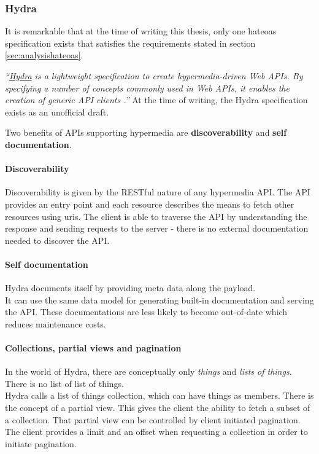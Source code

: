 \subsubsection{Hydra}
It is remarkable that at the time of writing this thesis, only one \gls{hateoas} specification exists that satisfies the requirements stated in section \ref{sec:analysishateoas}.

\textit{``\href{http://www.hydra-cg.com/}{Hydra} is a lightweight specification to create hypermedia-driven Web APIs. By specifying a number of concepts commonly used in Web APIs, it enables the creation of generic API clients \citep{hydraspecs}.''} At the time of writing, the Hydra specification exists as an unofficial draft.

Two benefits of APIs supporting hypermedia are \textbf{discoverability} and \textbf{self documentation}.

\paragraph{Discoverability} Discoverability is given by the RESTful nature of any hypermedia API. The API provides an entry point and each resource describes the means to fetch other resources using \gls{uri}s. The client is able to traverse the API by understanding the response and sending requests to the server - there is no external documentation needed to discover the API.

\paragraph{Self documentation}
Hydra documents itself by providing meta data along the payload. \\
It can use the same data model for generating built-in documentation and serving the API. These documentations are less likely to become out-of-date which reduces maintenance costs.

\paragraph{Collections, partial views and pagination}
In the world of Hydra, there are conceptually only \textit{things} and \textit{lists of things}. There is no list of list of things. \\
Hydra calls a list of things collection, which can have things as members. There is the concept of a partial view. This gives the client the ability to fetch a subset of a collection. That partial view can be controlled by client initiated \gls{pagination}. The client provides a limit and an offset when requesting a collection in order to initiate \gls{pagination}.

